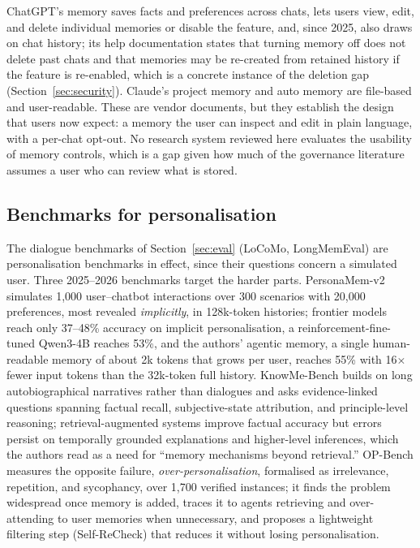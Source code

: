 \documentclass[11pt]{article}
\begin{document}
ChatGPT's memory \citep{openai2026memory} saves facts and preferences across chats, lets users view, edit, and delete individual memories or disable the feature, and, since 2025, also draws on chat history; its help documentation states that turning memory off does not delete past chats and that memories may be re-created from retained history if the feature is re-enabled, which is a concrete instance of the deletion gap (Section~\ref{sec:security}). Claude's project memory and auto memory \citep{anthropic2026claudecode} are file-based and user-readable. These are vendor documents, but they establish the design that users now expect: a memory the user can inspect and edit in plain language, with a per-chat opt-out. No research system reviewed here evaluates the usability of memory controls, which is a gap given how much of the governance literature assumes a user who can review what is stored.

\subsection{Benchmarks for personalisation}

The dialogue benchmarks of Section~\ref{sec:eval} (LoCoMo, LongMemEval) are personalisation benchmarks in effect, since their questions concern a simulated user. Three 2025--2026 benchmarks target the harder parts. PersonaMem-v2 \citep{jiang2025personamem2} simulates 1,000 user--chatbot interactions over 300 scenarios with 20,000 preferences, most revealed \emph{implicitly}, in 128k-token histories; frontier models reach only 37--48\% accuracy on implicit personalisation, a reinforcement-fine-tuned Qwen3-4B reaches 53\%, and the authors' agentic memory, a single human-readable memory of about 2k tokens that grows per user, reaches 55\% with 16$\times$ fewer input tokens than the 32k-token full history. KnowMe-Bench \citep{wu2026knowme} builds on long autobiographical narratives rather than dialogues and asks evidence-linked questions spanning factual recall, subjective-state attribution, and principle-level reasoning; retrieval-augmented systems improve factual accuracy but errors persist on temporally grounded explanations and higher-level inferences, which the authors read as a need for ``memory mechanisms beyond retrieval.'' OP-Bench \citep{hu2026opbench} measures the opposite failure, \emph{over-personalisation}, formalised as irrelevance, repetition, and sycophancy, over 1,700 verified instances; it finds the problem widespread once memory is added, traces it to agents retrieving and over-attending to user memories when unnecessary, and proposes a lightweight filtering step (Self-ReCheck) that reduces it without losing personalisation.
\end{document}
